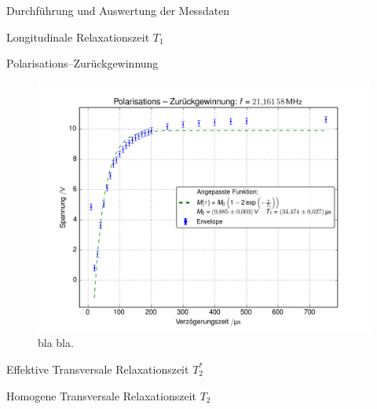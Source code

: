 \documentclass[pdftex, a4paper,11pt, twoside, ngerman]{report}
\begin{document}
\begin{chapter}{Durchführung und Auswertung der Messdaten}
\begin{section}{
        Longitudinale Relaxationszeit $T_{1}$}
\begin{subsection}{Polarisations--Zurückgewinnung}
        
        \begin{figure}[htb]
          \centering
          \includegraphics[width=\textwidth]
          {Figures/PolarisationsZurueckgewinnung.png}
          \caption{bla bla.}
          \label{figPolarisation}
        \end{figure}
        
        
      \end{subsection}
      
    \end{section}
    
    
    \newpage
    \begin{section}{
        Effektive Transversale Relaxationszeit $T_{2}^{*}$}
      \label{chpEffTransRelax}
      
      
    \end{section}
    
    
    \newpage
    \begin{section}{
        Homogene Transversale Relaxationszeit $T_{2}$}
      \label{chpHomoTransRelax}
      
      

\end{section}
\end{chapter}
\end{document}
